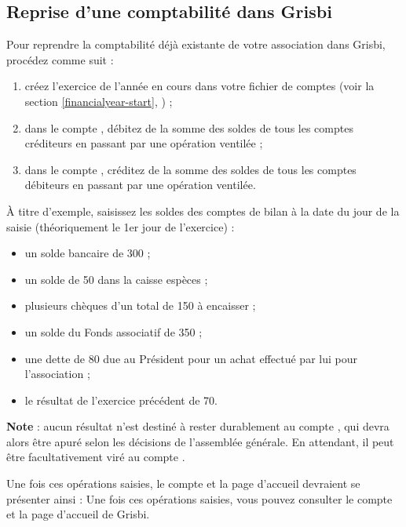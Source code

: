 \ifIllustration
\newpage
\fi


\subsection{Reprise d'une comptabilité dans Grisbi\label{association-plan-opening}}
 
Pour reprendre la comptabilité déjà existante de votre association dans Grisbi, procédez comme suit :

\begin{enumerate}
	\item créez l'exercice de l'année en cours dans votre fichier de comptes (voir la section \vref{financialyear-start}, ) ;
	\item dans le compte , débitez de la somme des soldes de tous les comptes créditeurs en passant par une opération ventilée ;
	\item dans le compte , créditez de la somme des soldes de tous les comptes débiteurs en passant par une opération ventilée.
\end{enumerate}	
				
À titre d'exemple, saisissez les soldes des comptes de bilan à la date du jour de la saisie (théoriquement le 1er jour de l’exercice) :
\begin{itemize}
	\item un solde bancaire de 300 ;
	\item un solde de 50 dans la caisse espèces ;
	\item plusieurs chèques d’un total de 150 à encaisser ;
	\item un solde du Fonds associatif de 350 ;
	\item une dette de 80 due au Président pour un achat effectué par lui pour l’association ;
	\item le résultat de l'exercice précédent de 70.			
\end{itemize}

\textbf{Note} : aucun résultat n'est destiné à rester durablement au compte , qui devra alors être apuré selon les décisions de l'assemblée générale. En attendant, il peut être facultativement viré au compte .

\ifIllustration Une fois ces opérations saisies, le compte  et la page d'accueil  devraient se présenter ainsi :
\else Une fois ces opérations saisies, vous pouvez consulter le compte  et la page d'accueil de Grisbi.
\fi 

